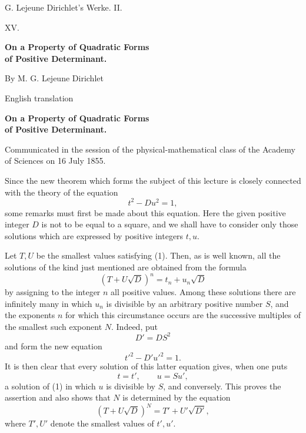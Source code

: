 \documentclass[11pt]{article}
\begin{document}
\begin{center}
{\Large G. Lejeune Dirichlet's Werke. II.}\par\vspace{1.2em}
{\Large XV.}\par\vspace{0.5em}
{\LARGE \textbf{On a Property of Quadratic Forms\\ of Positive Determinant.}}\par\vspace{1em}
{\large By M. G. Lejeune Dirichlet}\par\vspace{0.5em}
{\small English translation}
\end{center}

\begin{center}
{\large \textbf{On a Property of Quadratic Forms\\ of Positive Determinant.}}\par
{\small Communicated in the session of the physical-mathematical class of the Academy of Sciences on 16 July 1855.}
\end{center}

Since the new theorem which forms the subject of this lecture is closely connected with the theory of the equation
\[
\tag{1} t^2-Du^2=1,
\]
some remarks must first be made about this equation. Here the given positive integer \(D\) is not to be equal to a square, and we shall have to consider only those solutions which are expressed by positive integers \(t,u\).

Let \(T,U\) be the smallest values satisfying (1). Then, as is well known, all the solutions of the kind just mentioned are obtained from the formula
\[
(T+U\sqrt D)^n=t_n+u_n\sqrt D
\]
by assigning to the integer \(n\) all positive values. Among these solutions there are infinitely many in which \(u_n\) is divisible by an arbitrary positive number \(S\), and the exponents \(n\) for which this circumstance occurs are the successive multiples of the smallest such exponent \(N\). Indeed, put
\[
D'=DS^2
\]
and form the new equation
\[
t'^2-D'u'^2=1.
\]
It is then clear that every solution of this latter equation gives, when one puts
\[
t=t',\qquad u=Su',
\]
a solution of (1) in which \(u\) is divisible by \(S\), and conversely. This proves the assertion and also shows that \(N\) is determined by the equation
\[
(T+U\sqrt D)^N=T'+U'\sqrt {D'},
\]
where \(T',U'\) denote the smallest values of \(t',u'\).
\end{document}

